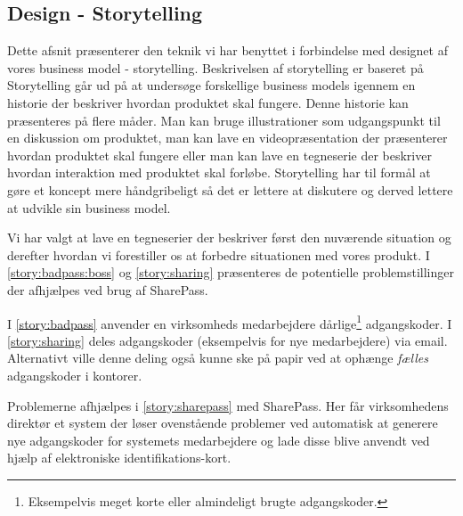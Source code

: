 \subsection{Design - Storytelling}
Dette afsnit præsenterer den teknik vi har benyttet i forbindelse med designet af vores business model - storytelling.
Beskrivelsen af storytelling er baseret på \citet[p.~125]{osterwalder2009business}
Storytelling går ud på at undersøge forskellige business models igennem en historie der beskriver hvordan produktet skal fungere.
Denne historie kan præsenteres på flere måder.
Man kan bruge illustrationer som udgangspunkt til en diskussion om produktet, man kan lave en videopræsentation der præsenterer hvordan produktet skal fungere eller man kan lave en tegneserie der beskriver hvordan interaktion med produktet skal forløbe.
Storytelling har til formål at gøre et koncept mere håndgribeligt så det er lettere at diskutere og derved lettere at udvikle sin business model.

Vi har valgt at lave en tegneserier der beskriver først den nuværende situation og derefter hvordan vi forestiller os at forbedre situationen med vores produkt.
I \cref{story:badpass:boss} og \cref{story:sharing} præsenteres de potentielle problemstillinger der afhjælpes ved brug af SharePass.

I \cref{story:badpass} anvender en virksomheds medarbejdere dårlige\footnote{Eksempelvis meget korte eller almindeligt brugte adgangskoder.} adgangskoder.
I \cref{story:sharing} deles adgangskoder (eksempelvis for nye medarbejdere) via email.
Alternativt ville denne deling også kunne ske på papir ved at ophænge \emph{fælles} adgangskoder i kontorer.

Problemerne afhjælpes i \cref{story:sharepass} med SharePass.
Her får virksomhedens direktør et system der løser ovenstående problemer ved automatisk at generere nye adgangskoder for systemets medarbejdere og lade disse blive anvendt ved hjælp af elektroniske identifikations-kort.

